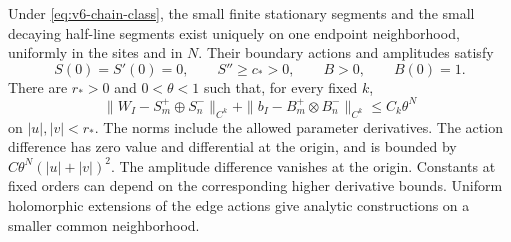 \begin{theorem}
\label{thm:v6-chain}
Under \eqref{eq:v6-chain-class}, the small finite stationary segments
and the small decaying half-line segments exist uniquely on one
endpoint neighborhood, uniformly in the sites and in $N$. Their
boundary actions and amplitudes satisfy
\[
 S(0)=S'(0)=0,\qquad S''\ge c_*>0,\qquad B>0,\qquad B(0)=1.
\]
There are $r_*>0$ and $0<\theta<1$ such that, for every fixed $k$,
\begin{equation}\label{eq:v6-factorization}
 \|W_I-S_m^+\oplus S_n^-\|_{C^k}
 +\|b_I-B_m^+\otimes B_n^-\|_{C^k}\le C_k\theta^N
\end{equation}
on $|u|,|v|<r_*$. The norms include the allowed parameter derivatives.
The action difference has zero value and differential at the origin,
and is bounded by $C\theta^N(|u|+|v|)^2$. The amplitude difference
vanishes at the origin. Constants at fixed orders can depend on the
corresponding higher derivative bounds. Uniform holomorphic extensions
of the edge actions give analytic constructions on a smaller common
neighborhood.
\end{theorem}
